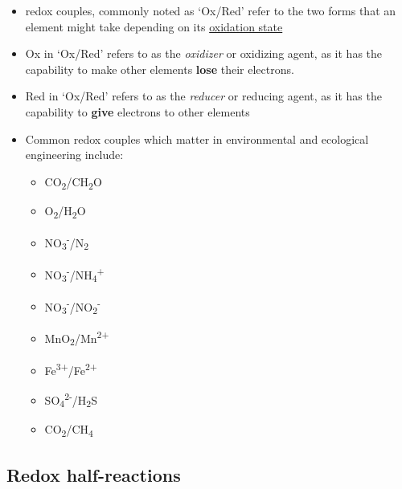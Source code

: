 \documentclass[]{book}
\providecommand{\tightlist}{%
  \setlength{\itemsep}{0pt}\setlength{\parskip}{0pt}}
\theoremstyle{definition}
\theoremstyle{definition}
\theoremstyle{definition}
\theoremstyle{remark}
\begin{document}
\begin{itemize}
\tightlist
\item
  redox couples, commonly noted as `Ox/Red' refer to the two forms that
  an element might take depending on its
  \protect\hyperlink{oxidation-state}{oxidation state}
\item
  Ox in `Ox/Red' refers to as the \emph{oxidizer} or oxidizing agent, as
  it has the capability to make other elements \textbf{lose} their
  electrons.
\item
  Red in `Ox/Red' refers to as the \emph{reducer} or reducing agent, as
  it has the capability to \textbf{give} electrons to other elements
\item
  Common redox couples which matter in environmental and ecological
  engineering include:

  \begin{itemize}
  \tightlist
  \item
    CO\textsubscript{2}/CH\textsubscript{2}O
  \item
    O\textsubscript{2}/H\textsubscript{2}O
  \item
    NO\textsubscript{3}\textsuperscript{-}/N\textsubscript{2}
  \item
    NO\textsubscript{3}\textsuperscript{-}/NH\textsubscript{4}\textsuperscript{+}
  \item
    NO\textsubscript{3}\textsuperscript{-}/NO\textsubscript{2}\textsuperscript{-}
  \item
    MnO\textsubscript{2}/Mn\textsuperscript{2+}
  \item
    Fe\textsuperscript{3+}/Fe\textsuperscript{2+}
  \item
    SO\textsubscript{4}\textsuperscript{2-}/H\textsubscript{2}S
  \item
    CO\textsubscript{2}/CH\textsubscript{4}
  \end{itemize}
\end{itemize}

\subsection{Redox half-reactions}\label{redox-half-reactions}
\end{document}
